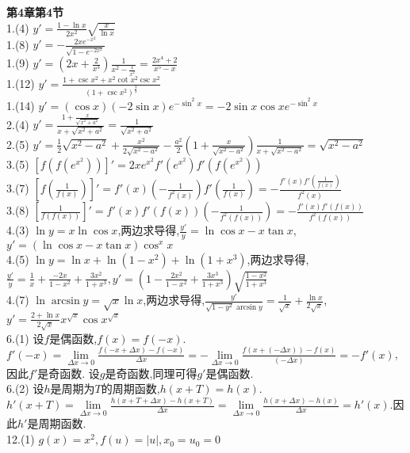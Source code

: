 \documentclass[12pt, a4paper, oneside]{ctexart}
\begin{document}
    \textbf{第4章第4节}\\
    1.(4) $y'=\frac{1-\ln x}{2x^2}\sqrt{\frac{x}{\ln x}}$\\
    1.(8) $y'=-\frac{2xe^{-x^2}}{\sqrt{1-e^{-2x^2}}}$\\
    1.(9) $y'=(2x+\frac{2}{x^3})\frac{1}{x^2-\frac{1}{x^2}}=\frac{2x^4+2}{x^5-x}$\\
    1.(12) $y'=\frac{1+\csc x^2+x^2\cot x^2\csc x^2}{(1+\csc x^2)^{\frac32}}$\\
    1.(14) $y'=(\cos x)(-2\sin x)e^{-\sin^2x}=-2\sin x\cos xe^{-\sin^2x}$\\
    2.(4) $y'=\frac{1+\frac{x}{\sqrt{x^2+a^2}}}{x+\sqrt{x^2+a^2}}=\frac{1}{\sqrt{x^2+a^2}}$\\
    2.(5) $y'=\frac12\sqrt{x^2-a^2}+\frac{x^2}{2\sqrt{x^2-a^2}}-\frac{a^2}{2}(1+\frac{x}{\sqrt{x^2-a^2}})\frac{1}{x+\sqrt{x^2-a^2}}
    =\sqrt{x^2-a^2}$\\
    3.(5) $[f(f(e^{x^2}))]'=2xe^{x^2}f'(e^{x^2})f'(f(e^{x^2}))$\\
    3.(7) $[f(\frac{1}{f(x)})]'=f'(x)(-\frac{1}{f^2(x)})f'(\frac{1}{f(x)})=-\frac{f'(x)f'(\frac{1}{f(x)})}{f^2(x)}$\\
    3.(8) $[\frac{1}{f(f(x))}]'=f'(x)f'(f(x))(-\frac{1}{f^2(f(x))})=-\frac{f'(x)f'(f(x))}{f^2(f(x))}$\\
    4.(3) $\ln y=x\ln\cos x$,两边求导得,$\frac{y'}{y}=\ln\cos x-x\tan x$,$y'=(\ln\cos x-x\tan x)\cos^xx$\\
    4.(5) $\ln y=\ln x+\ln(1-x^2)+\ln(1+x^3)$,两边求导得,$\frac{y'}{y}=\frac{1}{x}+\frac{-2x}{1-x^2}+\frac{3x^2}{1+x^3},
    y'=(1-\frac{2x^2}{1-x^2}+\frac{3x^3}{1+x^3})\sqrt{\frac{1-x^2}{1+x^3}}$\\
    4.(7) $\ln \arcsin y=\sqrt x\ln x$,两边求导得,$\frac{y'}{\sqrt{1-y^2}\arcsin y}=\frac{1}{\sqrt x}+\frac{\ln x}{2\sqrt x}$,
    $y'=\frac{2+\ln x}{2\sqrt x}x^{\sqrt x}\cos x^{\sqrt x}$\\
    6.(1) 设$f$是偶函数,$f(x)=f(-x)$.$f'(-x)=\lim\limits_{\Delta x\to 0}\frac{f(-x+\Delta x)-f(-x)}{\Delta x}
    =-\lim\limits_{\Delta x\to 0}\frac{f(x+(-\Delta x))-f(x)}{(-\Delta x)}=-f'(x)$,因此$f'$是奇函数.
    设$g$是奇函数,同理可得$g'$是偶函数.\\
    6.(2) 设$h$是周期为$T$的周期函数,$h(x+T)=h(x)$.$h'(x+T)=\lim\limits_{\Delta x\to 0}\frac{h(x+T+\Delta x)-h(x+T)}{\Delta x}
    =\lim\limits_{\Delta x\to 0}\frac{h(x+\Delta x)-h(x)}{\Delta x}=h'(x)$.因此$h'$是周期函数.\\
    12.(1) $g(x)=x^2,f(u)=|u|,x_0=u_0=0$\\
\end{document}
